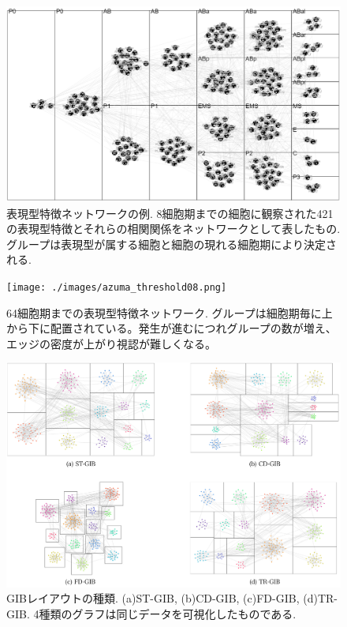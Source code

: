 \documentclass{kuee}
\begin{document}
\begin{figure}
  \centering
  \includegraphics[width=15cm]{./images/PhenotypeNet.png}
  \caption{表現型特徴ネットワークの例. 8細胞期までの細胞に観察された421の表現型特徴とそれらの相関関係をネットワークとして表したもの. グループは表現型が属する細胞と細胞の現れる細胞期により決定される. \label{fig:example_phenotype}}
\end{figure}

\begin{figure}
  \centering
  \texttt{[image: ./images/azuma\_threshold08.png]}
  \caption{64細胞期までの表現型特徴ネットワーク. グループは細胞期毎に上から下に配置されている。発生が進むにつれグループの数が増え、エッジの密度が上がり視認が難しくなる。 \label{fig:64-origin-layout}}
\end{figure}

\begin{figure}
  \centering
  \includegraphics[width=15cm]{./images/examples.png}
  \caption{GIBレイアウトの種類. (a)ST-GIB, (b)CD-GIB, (c)FD-GIB, (d)TR-GIB. 4種類のグラフは同じデータを可視化したものである. \label{fig:example_GIB}}
\end{figure}
\end{document}
